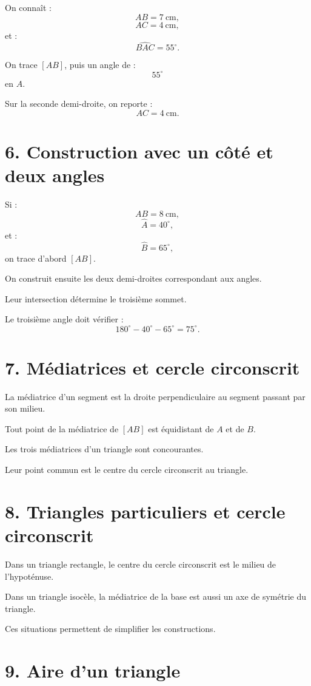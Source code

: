 On connaît :
\[
AB=7\ \text{cm},
\]
\[
AC=4\ \text{cm},
\]
et :
\[
\widehat{BAC}=55^\circ.
\]

On trace $[AB]$, puis un angle de :
\[
55^\circ
\]
en $A$.

Sur la seconde demi-droite, on reporte :
\[
AC=4\ \text{cm}.
\]

\section{6. Construction avec un côté et deux angles}

Si :
\[
AB=8\ \text{cm},
\]
\[
\widehat{A}=40^\circ,
\]
et :
\[
\widehat{B}=65^\circ,
\]
on trace d'abord $[AB]$.

On construit ensuite les deux demi-droites correspondant aux angles.

Leur intersection détermine le troisième sommet.

Le troisième angle doit vérifier :
\[
180^\circ-40^\circ-65^\circ=75^\circ.
\]

\section{7. Médiatrices et cercle circonscrit}

La médiatrice d'un segment est la droite perpendiculaire au segment passant par son milieu.

Tout point de la médiatrice de $[AB]$ est équidistant de $A$ et de $B$.

Les trois médiatrices d'un triangle sont concourantes.

Leur point commun est le centre du cercle circonscrit au triangle.

\section{8. Triangles particuliers et cercle circonscrit}

Dans un triangle rectangle, le centre du cercle circonscrit est le milieu de l'hypoténuse.

Dans un triangle isocèle, la médiatrice de la base est aussi un axe de symétrie du triangle.

Ces situations permettent de simplifier les constructions.

\section{9. Aire d'un triangle}

